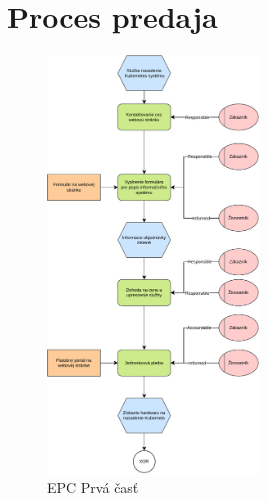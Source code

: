\chapter{Proces predaja}

\begin{figure}[htbp]
  \centering
  \includegraphics[width=0.5\textwidth]{images/EPC_1.pdf}
  \caption{EPC Prvá časť}
\end{figure}

